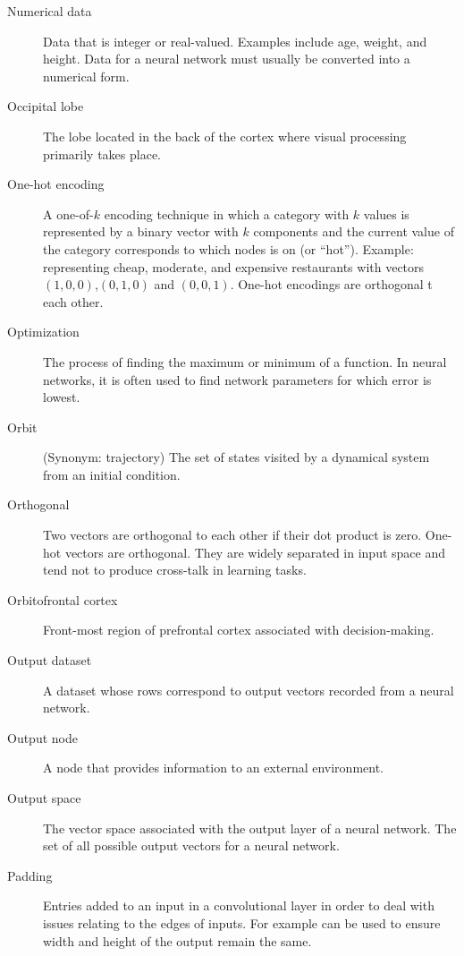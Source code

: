 \begin{description}
\item[Numerical data] Data that is integer or real-valued. Examples include age, weight, and height. Data for a neural network must usually be converted into a numerical form.

\item[Occipital lobe] The lobe located in the back of the cortex where visual processing primarily takes place. 

\item[One-hot encoding] A one-of-$k$ encoding technique in which  a category with $k$ values is represented by a binary vector with $k$ components and the current value of the category corresponds to which nodes is on (or ``hot''). Example: representing cheap, moderate, and expensive restaurants with vectors $(1,0,0)$,$(0,1,0)$ and $(0,0,1)$. One-hot encodings are orthogonal t each other.

\item[Optimization] The process of finding the maximum or minimum of a function. In neural networks, it is often used to find network parameters for which error is lowest.

\item[Orbit] (Synonym: trajectory) The set of states visited by a dynamical system from an initial condition. 

\item[Orthogonal] Two vectors are orthogonal to each other if their dot product is zero. One-hot vectors are orthogonal. They are widely separated in input space and tend not to produce cross-talk in learning tasks.

\item[Orbitofrontal cortex] Front-most region of prefrontal cortex associated with decision-making.

\item[Output dataset] A dataset whose rows correspond to output vectors recorded from a neural network. 

\item[Output node] A node that provides information to an external environment.  

\item[Output space] The vector space associated with the output layer of a neural network. The set of all possible output vectors for a neural network.

\item[Padding] Entries added to an input in a convolutional layer in order to deal with issues relating to the edges of inputs. For example can be used to ensure width and height of the output remain the same.


\end{description}
